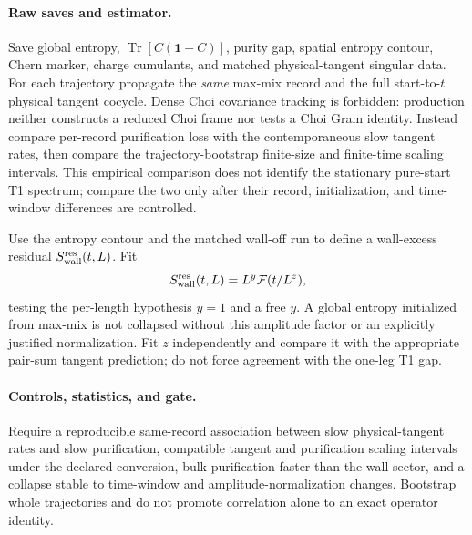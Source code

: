 \documentclass[aps,prx,twocolumn,floatfix,nofootinbib,superscriptaddress,longbibliography]{revtex4-2}
\newcommand{\mc}[1]{\mathcal{#1}}
\newcommand{\qTr}{\operatorname{Tr}}
\begin{document}
\paragraph*{Raw saves and estimator.}
Save global entropy, $\qTr[C(\mathbf{1}-C)]$, purity gap, spatial entropy contour, Chern marker,
charge cumulants, and matched physical-tangent singular data.  For each trajectory
propagate the \emph{same} max-mix record and the full start-to-$t$ physical tangent
cocycle.  Dense Choi covariance tracking is forbidden: production neither constructs a
reduced Choi frame nor tests a Choi Gram identity.  Instead compare per-record
purification loss with the contemporaneous slow tangent rates, then compare the
trajectory-bootstrap finite-size and finite-time scaling intervals.  This empirical
comparison does not identify the stationary pure-start T1 spectrum; compare the two only
after their record, initialization, and time-window differences are controlled.

Use the entropy contour and the matched wall-off run to define a wall-excess residual
$S_{\rm wall}^{\rm res}(t,L)$.  Fit
\begin{equation}
 S_{\rm wall}^{\rm res}(t,L)=L^y\mc F(t/L^z),
 \label{eq:purification-collapse}
\end{equation}
testing the per-length hypothesis $y=1$ and a free $y$.  A global entropy initialized from
max-mix is not collapsed without this amplitude factor or an explicitly justified
normalization.  Fit $z$ independently and compare it with the appropriate pair-sum tangent
prediction; do not force agreement with the one-leg T1 gap.

\paragraph*{Controls, statistics, and gate.}
Require a reproducible same-record association between slow physical-tangent rates and
slow purification, compatible tangent and purification scaling intervals under the
declared conversion, bulk purification faster than the wall sector, and a collapse stable
to time-window and amplitude-normalization changes.  Bootstrap whole trajectories and do
not promote correlation alone to an exact operator identity.
\end{document}
